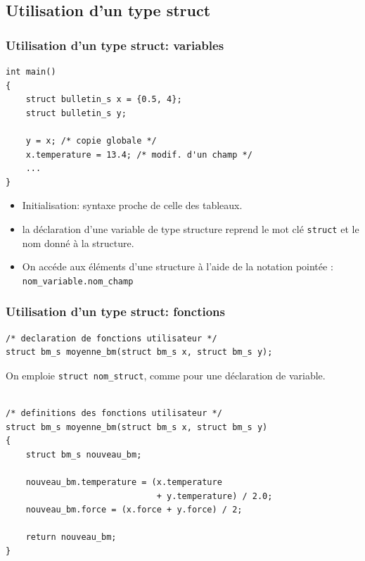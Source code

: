 \documentclass[xcolor=pdftex,svgnames,table]{beamer}
\begin{document}
\subsection[Utilisation]{Utilisation d'un type struct}
\begin{frame}[fragile]
  \frametitle{Utilisation d'un type struct: variables}

\begin{lstlisting}[escapechar={\%},basicstyle=\ttfamily\small]
int main()
{
    struct bulletin_s x = {0.5, 4};
    struct bulletin_s y;

    y = x; /* copie globale */
    x.temperature = 13.4; /* modif. d'un champ */
    ...
}
\end{lstlisting}
\pause
\begin{itemize}
\item Initialisation:  syntaxe proche de celle des tableaux.
\pause
\item la déclaration d'une variable de type structure reprend le mot
  clé \verb|struct| et le nom donné à la structure.
\pause
\item On accéde aux éléments d'une structure à l'aide de la notation
  pointée :
\verb|nom_variable.nom_champ|
\end{itemize}
\end{frame}

\begin{frame}[fragile]
  \frametitle{Utilisation d'un type struct: fonctions}

\begin{lstlisting}[escapechar={\%},basicstyle=\ttfamily\small]
/* declaration de fonctions utilisateur */
struct bm_s moyenne_bm(struct bm_s x, struct bm_s y);
\end{lstlisting}
\pause
On emploie \verb|struct nom_struct|, comme pour une déclaration de variable.
\begin{lstlisting}[escapechar={\%},basicstyle=\ttfamily\small]

/* definitions des fonctions utilisateur */
struct bm_s moyenne_bm(struct bm_s x, struct bm_s y)
{
    struct bm_s nouveau_bm;

    nouveau_bm.temperature = (x.temperature
                              + y.temperature) / 2.0;
    nouveau_bm.force = (x.force + y.force) / 2;

    return nouveau_bm;
}
\end{lstlisting}
\end{frame}
\end{document}
